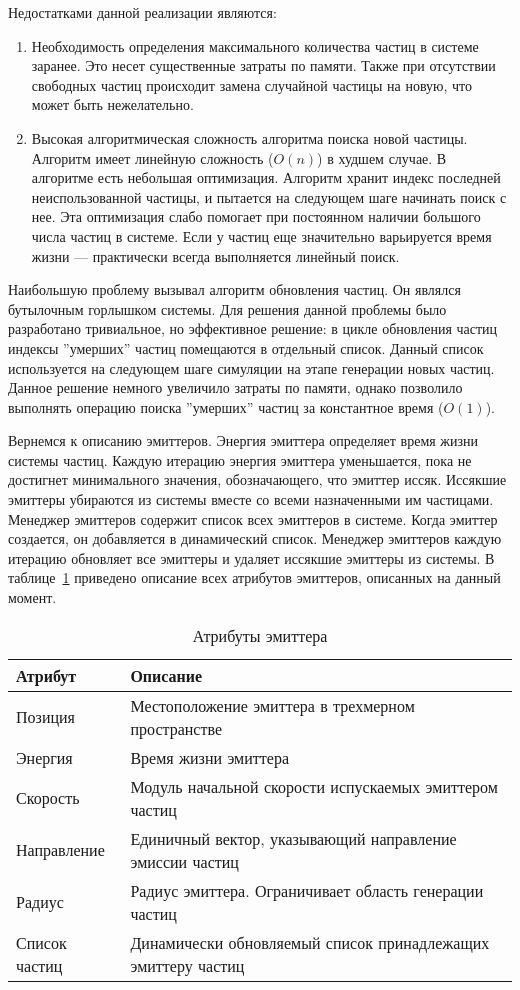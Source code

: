 Недостатками данной реализации являются:
\begin{enumerate}
    \item Необходимость определения максимального количества частиц в системе
    заранее. Это несет существенные затраты по памяти. Также при отсутствии
    свободных частиц происходит замена случайной частицы на новую, что может
    быть нежелательно.
    \item Высокая алгоритмическая сложность алгоритма поиска новой частицы.
    Алгоритм имеет линейную сложность ($O(n)$) в худшем случае. В алгоритме есть
    небольшая оптимизация. Алгоритм хранит индекс последней неиспользованной
    частицы, и пытается на следующем шаге начинать поиск с нее. Эта оптимизация
    слабо помогает при постоянном наличии большого числа частиц в системе.
    Если у частиц еще значительно варьируется время жизни --- практически всегда
    выполняется линейный поиск.
\end{enumerate}

Наибольшую проблему вызывал алгоритм обновления частиц. Он являлся бутылочным
горлышком системы. Для решения данной проблемы было разработано тривиальное, но
эффективное решение: в цикле обновления частиц индексы ''умерших'' частиц
помещаются в отдельный список. Данный список используется на следующем шаге
симуляции на этапе генерации новых частиц. Данное решение немного увеличило
затраты по памяти, однако позволило выполнять операцию поиска ''умерших'' частиц
за константное время ($O(1)$).

Вернемся к описанию эмиттеров. Энергия эмиттера определяет время жизни системы
частиц. Каждую итерацию энергия эмиттера уменьшается, пока не достигнет
минимального значения, обозначающего, что эмиттер иссяк. Иссякшие эмиттеры
убираются из системы вместе со всеми назначенными им частицами. Менеджер
эмиттеров содержит список всех эмиттеров в системе. Когда эмиттер создается, он
добавляется в динамический список. Менеджер эмиттеров каждую итерацию обновляет
все эмиттеры и удаляет иссякшие эмиттеры из системы. В
таблице~\ref{table:emitterAttribs} приведено описание всех атрибутов эмиттеров,
описанных на данный момент.
\begin{table}[htb]
\caption{Атрибуты эмиттера}%
\label{table:emitterAttribs}
\centering
\small
\begin{tabular}{| l | l |}
    \hline
    Атрибут & Описание \\
    \hline
    Позиция & Местоположение эмиттера в трехмерном пространстве \\
    Энергия & Время жизни эмиттера \\
    Скорость & Модуль начальной скорости испускаемых эмиттером частиц \\
    Направление & Единичный вектор, указывающий направление эмиссии частиц \\
    Радиус & Радиус эмиттера. Ограничивает область генерации частиц \\
    Список частиц & Динамически обновляемый список принадлежащих эмиттеру
    частиц \\
    \hline
\end{tabular}
\end{table}

